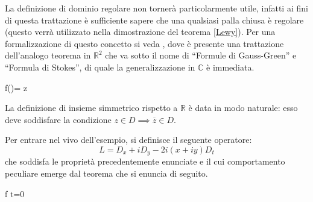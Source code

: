 \begin{remark}
La definizione di dominio regolare non tornerà particolarmente utile, infatti ai fini di questa trattazione è sufficiente sapere che una qualsiasi palla chiusa è regolare (questo verrà utilizzato nella dimostrazione del teorema \ref{Lewy}). Per una formalizzazione di questo concetto si veda \cite[cap.8]{FMS}, dove è presente una trattazione dell'analogo teorema in $\mathbb{R}^2$ che va sotto il nome di ``Formule di Gauss-Green'' e ``Formula di Stokes'', di quale la generalizzazione in $\mathbb{C}$ è immediata.
\end{remark}

\begin{namedtheorem}
{f()= \quad \forall z \in {}}
\end{namedtheorem}

\begin{remark}
La definizione di insieme simmetrico rispetto a $\mathbb{R}$ è data in modo naturale: esso deve soddisfare la condizione $z \in D \implies \overline{z} \in D$.
\end{remark}

Per entrare nel vivo dell'esempio, si definisce il seguente operatore:
$$L=D_x+iD_y-2i(x+iy)D_t$$
che soddisfa le proprietà precedentemente enunciate e il cui comportamento peculiare emerge dal teorema che si enuncia di seguito.

\begin{theorem}\label{Lewy}
{f  t=0}
\end{theorem}

